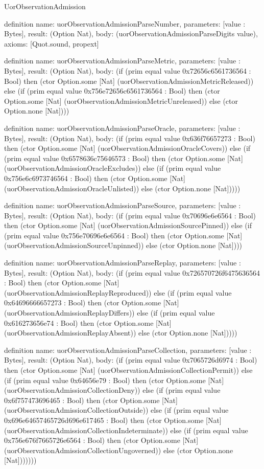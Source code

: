 \begin{lexlean}{UorObservationAdmission}
\begin{semanticmodule}
definition{
  name: uorObservationAdmissionParseNumber,
  parameters: [value : Bytes],
  result: (Option Nat),
  body: (uorObservationAdmissionParseDigits value),
  axioms: [Quot.sound, propext]
}

definition{
  name: uorObservationAdmissionParseMetric,
  parameters: [value : Bytes],
  result: (Option Nat),
  body: (if (prim equal value 0x72656c6561736564 : Bool) then (ctor Option.some [Nat] (uorObservationAdmissionMetricReleased)) else (if (prim equal value 0x756e72656c6561736564 : Bool) then (ctor Option.some [Nat] (uorObservationAdmissionMetricUnreleased)) else (ctor Option.none [Nat])))
}

definition{
  name: uorObservationAdmissionParseOracle,
  parameters: [value : Bytes],
  result: (Option Nat),
  body: (if (prim equal value 0x636f76657273 : Bool) then (ctor Option.some [Nat] (uorObservationAdmissionOracleCovers)) else (if (prim equal value 0x6578636c75646573 : Bool) then (ctor Option.some [Nat] (uorObservationAdmissionOracleExcludes)) else (if (prim equal value 0x756e6c6973746564 : Bool) then (ctor Option.some [Nat] (uorObservationAdmissionOracleUnlisted)) else (ctor Option.none [Nat]))))
}

definition{
  name: uorObservationAdmissionParseSource,
  parameters: [value : Bytes],
  result: (Option Nat),
  body: (if (prim equal value 0x70696e6e6564 : Bool) then (ctor Option.some [Nat] (uorObservationAdmissionSourcePinned)) else (if (prim equal value 0x756e70696e6e6564 : Bool) then (ctor Option.some [Nat] (uorObservationAdmissionSourceUnpinned)) else (ctor Option.none [Nat])))
}

definition{
  name: uorObservationAdmissionParseReplay,
  parameters: [value : Bytes],
  result: (Option Nat),
  body: (if (prim equal value 0x726570726f6475636564 : Bool) then (ctor Option.some [Nat] (uorObservationAdmissionReplayReproduced)) else (if (prim equal value 0x64696666657273 : Bool) then (ctor Option.some [Nat] (uorObservationAdmissionReplayDiffers)) else (if (prim equal value 0x616273656e74 : Bool) then (ctor Option.some [Nat] (uorObservationAdmissionReplayAbsent)) else (ctor Option.none [Nat]))))
}

definition{
  name: uorObservationAdmissionParseCollection,
  parameters: [value : Bytes],
  result: (Option Nat),
  body: (if (prim equal value 0x7065726d6974 : Bool) then (ctor Option.some [Nat] (uorObservationAdmissionCollectionPermit)) else (if (prim equal value 0x64656e79 : Bool) then (ctor Option.some [Nat] (uorObservationAdmissionCollectionDeny)) else (if (prim equal value 0x6f757473696465 : Bool) then (ctor Option.some [Nat] (uorObservationAdmissionCollectionOutside)) else (if (prim equal value 0x696e64657465726d696e617465 : Bool) then (ctor Option.some [Nat] (uorObservationAdmissionCollectionIndeterminate)) else (if (prim equal value 0x756e676f7665726e6564 : Bool) then (ctor Option.some [Nat] (uorObservationAdmissionCollectionUngoverned)) else (ctor Option.none [Nat]))))))
}


\end{semanticmodule}
\end{lexlean}
